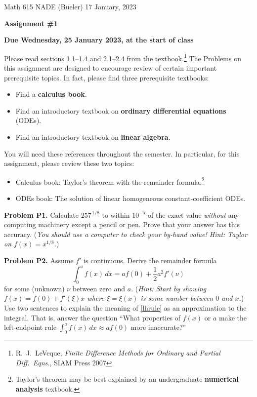 \documentclass[12pt]{amsart}
\newcommand{\prob}[1]{\bigskip\noindent\textbf{#1}\quad }
\begin{document}
\scriptsize \noindent Math 615 NADE (Bueler) \hfill 17 January, 2023
\normalsize

\medskip\bigskip

\Large\centerline{\textbf{Assignment \#1}}
\large
\bigskip

\centerline{\textbf{Due Wednesday, 25 January 2023, at the start of class}}
\bigskip
\normalsize

\thispagestyle{empty}

\bigskip
Please read sections 1.1--1.4 and 2.1--2.4 from the textbook.\footnote{R.~J.~LeVeque, \emph{Finite Difference Methods for Ordinary and Partial Diff.~Eqns.}, SIAM Press 2007}  The Problems on this assignment are designed to encourage review of certain important prerequisite topics.  In fact, please find three prerequisite textbooks:
\begin{itemize}
\item Find a \textbf{calculus book}.
\item Find an introductory textbook on \textbf{ordinary differential equations} (ODEs).
\item Find an introductory textbook on \textbf{linear algebra}.
\end{itemize}
You will need these references throughout the semester.  In particular, for this assignment, please review these two topics:
\begin{itemize}
  \item[] Calculus book: Taylor's theorem with the remainder formula.\footnote{Taylor's theorem may be best explained by an undergraduate \textbf{numerical analysis} textbook.}
  \item[] ODEs book: The solution of linear homogeneous constant-coefficient ODEs.
\end{itemize}

\medskip
\prob{Problem P1.}  Calculate $257^{\,1/8}$ to within $10^{-5}$ of the exact value \emph{without} any computing machinery except a pencil or pen.    Prove that your answer has this accuracy.  (\emph{You should use a computer to \emph{check} your by-hand value!  Hint: Taylor on $f(x)=x^{1/8}$.})

\prob{Problem P2.}  Assume $f'$ is continuous.  Derive the remainder formula
\begin{equation}\label{lhrule}
\int_0^a f(x)\,dx = a f(0) + \frac{1}{2} a^2 f'(\nu)
\end{equation}
for some (unknown) $\nu$ between zero and $a$.  (\emph{Hint:  Start by showing $f(x)=f(0)+f'(\xi)x$ where $\xi=\xi(x)$ is some number between $0$ and $x$.})  Use two sentences to explain the meaning of \eqref{lhrule} as an approximation to the integral.  That is, answer the question ``What properties of $f(x)$ or $a$ make the left-endpoint rule $\int_0^a f(x)\,dx \approx a f(0)$ more inaccurate?''
\end{document}
